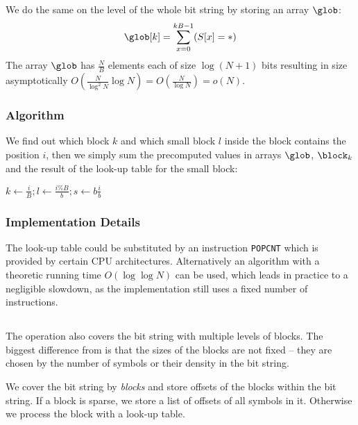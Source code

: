We do the same on the level of the whole bit string by storing an array $\glob$:
$$ \glob[k] = \sum_{x = 0}^{k B - 1} (S[x] = \ph) $$
The array $\glob$ has $\frac{N}{B}$ elements each of size $\log (N+1)$ bits resulting in size asymptotically $O(\frac{N}{\log^2 N} \log{N}) = O(\frac{N}{\log N}) = o(N)$.

\subsubsection{Algorithm}

We find out which block $k$ and which small block $l$ inside the block contains the position $i$, then we simply sum the precomputed values in arrays $\glob$, $\block_k$ and the result of the look-up table for the small block:
\begin{algorithm}
\begin{algorithmic}
	\State $k \gets \frac{i}{B}; l \gets \frac{i \% B}{b}; s \gets b \frac{i}{b}$
	\State{}
\EndFunction
\end{algorithmic}
\end{algorithm}

\subsubsection{Implementation Details}

The look-up table could be substituted by an instruction \verb|POPCNT| which is provided by certain CPU architectures.
Alternatively an algorithm with a theoretic running time $O(\log \log N)$ can be used, which leads in practice to a negligible slowdown, as the implementation still uses a fixed number of instructions.

\subsection{\select}\label{ss:select}


The \select{} operation also covers the bit string with multiple levels of blocks.
The biggest difference from \rank{} is that the sizes of the blocks are not fixed -- they are chosen by the number of symbols \ph{} or their density in the bit string.

We cover the bit string by \emph{blocks} and store offsets of the blocks within the bit string.
If a block is sparse, we store a list of offsets of all symbols \ph{} in it.
Otherwise we process the block with a look-up table.

